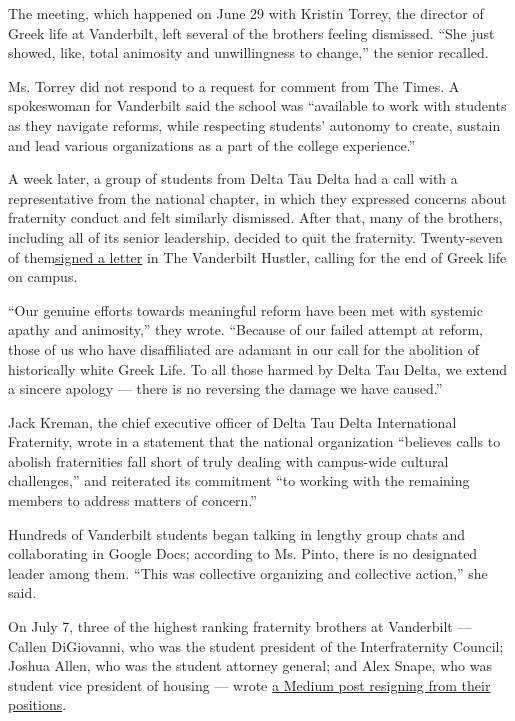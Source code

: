 The meeting, which happened on June 29 with Kristin Torrey, the director
of Greek life at Vanderbilt, left several of the brothers feeling
dismissed. ``She just showed, like, total animosity and unwillingness to
change,'' the senior recalled.

Ms. Torrey did not respond to a request for comment from The Times. A
spokeswoman for Vanderbilt said the school was ``available to work with
students as they navigate reforms, while respecting students' autonomy
to create, sustain and lead various organizations as a part of the
college experience.''

A week later, a group of students from Delta Tau Delta had a call with a
representative from the national chapter, in which they expressed
concerns about fraternity conduct and felt similarly dismissed. After
that, many of the brothers, including all of its senior leadership,
decided to quit the fraternity. Twenty-seven of
them\href{https://vanderbilthustler.com/33241/featured/guest-editorial-a-message-from-the-former-brothers-of-delta-tau-delta/}{signed
a letter} in The Vanderbilt Hustler, calling for the end of Greek life
on campus.

``Our genuine efforts towards meaningful reform have been met with
systemic apathy and animosity,'' they wrote. ``Because of our failed
attempt at reform, those of us who have disaffiliated are adamant in our
call for the abolition of historically white Greek Life. To all those
harmed by Delta Tau Delta, we extend a sincere apology --- there is no
reversing the damage we have caused.''

Jack Kreman, the chief executive officer of Delta Tau Delta
International Fraternity, wrote in a statement that the national
organization ``believes calls to abolish fraternities fall short of
truly dealing with campus-wide cultural challenges,'' and reiterated its
commitment ``to working with the remaining members to address matters of
concern.''

Hundreds of Vanderbilt students began talking in lengthy group chats and
collaborating in Google Docs; according to Ms. Pinto, there is no
designated leader among them. ``This was collective organizing and
collective action,'' she said.

On July 7, three of the highest ranking fraternity brothers at
Vanderbilt --- Callen DiGiovanni, who was the student president of the
Interfraternity Council; Joshua Allen, who was the student attorney
general; and Alex Snape, who was student vice president of housing ---
wrote
\href{https://medium.com/@callendigi/we-resigned-from-thevanderbilt-university-interfraternity-council-a3a3378fe4b3}{a
Medium post resigning from their positions}.


